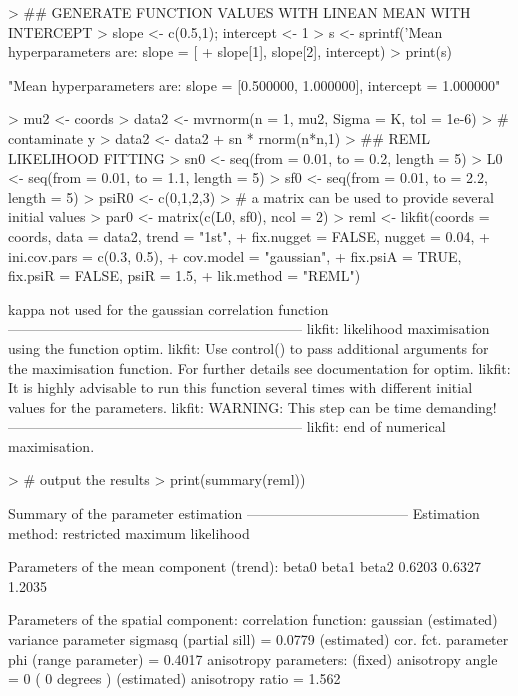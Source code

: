 \documentclass[a4paper]{article}
\begin{document}
\begin{Schunk}
\begin{Sinput}
> ## GENERATE FUNCTION VALUES WITH LINEAN MEAN WITH INTERCEPT
> slope <- c(0.5,1); intercept <- 1
> s <- sprintf('Mean hyperparameters are: slope = [%f, %f], intercept = %f', 
+               slope[1], slope[2], intercept)
> print(s)
\end{Sinput}
\begin{Soutput}
[1] "Mean hyperparameters are: slope = [0.500000, 1.000000], intercept = 1.000000"
\end{Soutput}
\begin{Sinput}
> mu2 <- coords %*% slope + intercept
> data2 <- mvrnorm(n = 1, mu2, Sigma = K, tol = 1e-6)
> # contaminate y
> data2 <- data2 + sn * rnorm(n*n,1)
> ## REML LIKELIHOOD FITTING
> sn0 <- seq(from = 0.01, to = 0.2, length = 5)
> L0 <- seq(from = 0.01, to = 1.1, length = 5) 
> sf0 <- seq(from = 0.01, to = 2.2, length = 5)
> psiR0 <- c(0,1,2,3)
> # a matrix can be used to provide several initial values
> par0 <- matrix(c(L0, sf0), ncol = 2)
> reml <- likfit(coords = coords, data = data2, trend = "1st", 
+ 	 	fix.nugget = FALSE, nugget = 0.04,
+ 	 	ini.cov.pars = c(0.3, 0.5),
+ 	 	cov.model = "gaussian", 
+        	fix.psiA = TRUE, fix.psiR = FALSE, psiR = 1.5,
+ 	 	lik.method = "REML")
\end{Sinput}
\begin{Soutput}
kappa not used for the gaussian correlation function
---------------------------------------------------------------
likfit: likelihood maximisation using the function optim.
likfit: Use control() to pass additional
         arguments for the maximisation function.
        For further details see documentation for optim.
likfit: It is highly advisable to run this function several
        times with different initial values for the parameters.
likfit: WARNING: This step can be time demanding!
---------------------------------------------------------------
likfit: end of numerical maximisation.
\end{Soutput}
\begin{Sinput}
> # output the results
> print(summary(reml))
\end{Sinput}
\begin{Soutput}
Summary of the parameter estimation
-----------------------------------
Estimation method: restricted maximum likelihood 

Parameters of the mean component (trend):
 beta0  beta1  beta2 
0.6203 0.6327 1.2035 

Parameters of the spatial component:
   correlation function: gaussian
      (estimated) variance parameter sigmasq (partial sill) =  0.0779
      (estimated) cor. fct. parameter phi (range parameter)  =  0.4017
   anisotropy parameters:
      (fixed) anisotropy angle = 0  ( 0 degrees )
      (estimated) anisotropy ratio = 1.562


\end{Soutput}
\end{Schunk}
\end{document}
